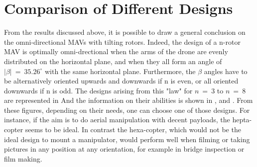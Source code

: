\section{Comparison of Different Designs}
\label{sec:comparison}

From the results discussed above, it is possible to draw a general conclusion on the
 omni-directional MAVs with tilting rotors. Indeed, the design of a n-rotor
MAV is optimally omni-drectional when the arms of the drone are evenly
distributed on the horizontal plane, and when they all form an angle of
$|\beta|\ =\ 35.26^{\circ}$ with the same horizontal plane. Furthermore, the
$\beta$ angles have to be alternatively oriented upwards and downwards if n
is even, or all oriented downwards if n is odd. The designs arising from this
"law" for $n\ = \ 3$ to $n\ = \ 8$ are represented in 
And the information on their abilities is shown in ,
 and .
From these figures, depending on their needs, one can choose one of those designs.
For instance, if the aim is to do aerial manipulation with decent payloads, the
hepta-copter seems to be ideal. In contrast the hexa-copter, which would not
be the ideal design to mount a manipulator, would perform well when filming or taking
pictures in any position at any orientation, for example in bridge inspection or film
making.

